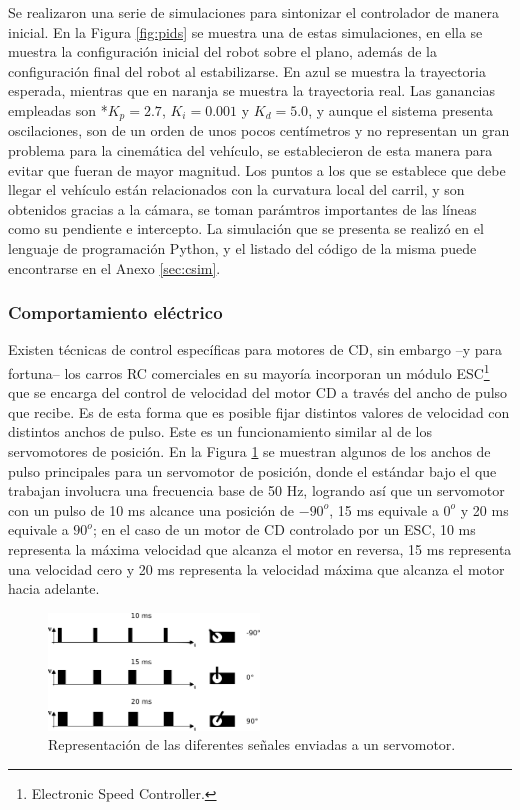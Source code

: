 \par Se realizaron una serie de simulaciones para sintonizar el controlador de manera inicial. En la Figura \ref{fig:pids} se muestra una de estas simulaciones, en ella se muestra la configuración inicial del robot sobre el plano, además de la configuración final del robot al estabilizarse. En azul se muestra la trayectoria esperada, mientras que en naranja se muestra la trayectoria real. Las ganancias empleadas son *$K_{p}=2.7$, $K_{i}=0.001$ y $K_{d}=5.0$, y aunque el sistema presenta oscilaciones, son de un orden de unos pocos centímetros y no representan un gran problema para la cinemática del vehículo, se establecieron de esta manera para evitar que fueran de mayor magnitud. Los puntos a los que se establece que debe llegar el vehículo están relacionados con la curvatura local del carril, y son obtenidos gracias a la cámara, se toman parámtros importantes de las líneas como su pendiente e intercepto. La simulación que se presenta se realizó en el lenguaje de programación Python, y el listado del código de la misma puede encontrarse en el Anexo \ref{sec:csim}.
\subsubsection{Comportamiento eléctrico}
\label{sssec:elecomp}
\par Existen técnicas de control específicas para motores de CD, sin embargo --y para fortuna-- los carros RC comerciales en su mayoría incorporan un módulo ESC\footnote{Electronic Speed Controller.} que se encarga del control de velocidad del motor CD a través del ancho de pulso que recibe. Es de esta forma que es posible fijar distintos valores de velocidad con distintos anchos de pulso. Este es un funcionamiento similar al de los servomotores de posición. En la Figura \ref{fig:pwm} se muestran algunos de los anchos de pulso principales para un servomotor de posición, donde el estándar bajo el que trabajan involucra una frecuencia base de 50 Hz, logrando así que un servomotor con un pulso de 10 ms alcance una posición de $-90^{o}$, 15 ms equivale a $0^{o}$ y 20 ms equivale a $90^{o}$; en el caso de un motor de CD controlado por un ESC, 10 ms representa la máxima velocidad que alcanza el motor en reversa, 15 ms representa una velocidad cero y 20 ms representa la velocidad máxima que alcanza el motor hacia adelante.
\begin{figure}[htbp!]
	\centering
	\includegraphics[width=0.5\textwidth]{./Figuras/PWM}
	\caption{Representación de las diferentes señales enviadas a un servomotor.}
	\label{fig:pwm}
\end{figure}
